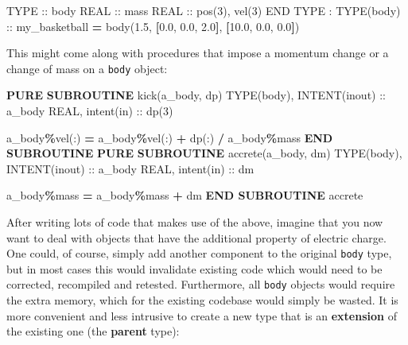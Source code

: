 \documentclass[
  paper=a4,
  ,captions=tableheading
]{scrartcl}
\newenvironment{Shaded}{\begin{snugshade}}{\end{snugshade}}
\newcommand{\DataTypeTok}[1]{\textcolor[rgb]{0.13,0.29,0.53}{#1}}
\newcommand{\DecValTok}[1]{\textcolor[rgb]{0.00,0.00,0.81}{#1}}
\newcommand{\FloatTok}[1]{\textcolor[rgb]{0.00,0.00,0.81}{#1}}
\newcommand{\KeywordTok}[1]{\textcolor[rgb]{0.13,0.29,0.53}{\textbf{#1}}}
\newcommand{\NormalTok}[1]{#1}
\newcommand{\OperatorTok}[1]{\textcolor[rgb]{0.81,0.36,0.00}{\textbf{#1}}}
\begin{document}
\begin{Shaded}
\begin{Highlighting}[]
\DataTypeTok{TYPE} \DataTypeTok{::}\NormalTok{ body}
   \DataTypeTok{REAL} \DataTypeTok{::}\NormalTok{ mass}
   \DataTypeTok{REAL} \DataTypeTok{::}\NormalTok{ pos(}\DecValTok{3}\NormalTok{), vel(}\DecValTok{3}\NormalTok{)}
\DataTypeTok{END TYPE}
\NormalTok{:}
\DataTypeTok{TYPE(body)} \DataTypeTok{::}\NormalTok{ my\_basketball }\KeywordTok{=}\NormalTok{ body(}\FloatTok{1.5}\NormalTok{, }\KeywordTok{[}\FloatTok{0.0}\NormalTok{, }\FloatTok{0.0}\NormalTok{, }\FloatTok{2.0}\KeywordTok{]}\NormalTok{, }\KeywordTok{[}\FloatTok{10.0}\NormalTok{, }\FloatTok{0.0}\NormalTok{, }\FloatTok{0.0}\KeywordTok{]}\NormalTok{)}
\end{Highlighting}
\end{Shaded}

This might come along with procedures that impose a momentum change or a
change of mass on a \texttt{body} object:

\begin{Shaded}
\begin{Highlighting}[]
\KeywordTok{PURE} \KeywordTok{SUBROUTINE}\NormalTok{ kick(a\_body, dp)}
   \DataTypeTok{TYPE(body)}\NormalTok{, }\DataTypeTok{INTENT(inout)} \DataTypeTok{::}\NormalTok{ a\_body}
   \DataTypeTok{REAL}\NormalTok{, }\DataTypeTok{intent(in)} \DataTypeTok{::}\NormalTok{ dp(}\DecValTok{3}\NormalTok{)}

\NormalTok{   a\_body}\OperatorTok{\%}\NormalTok{vel(:) }\KeywordTok{=}\NormalTok{ a\_body}\OperatorTok{\%}\NormalTok{vel(:) }\KeywordTok{+}\NormalTok{ dp(:) }\KeywordTok{/}\NormalTok{ a\_body}\OperatorTok{\%}\NormalTok{mass}
\KeywordTok{END SUBROUTINE}
\KeywordTok{PURE} \KeywordTok{SUBROUTINE}\NormalTok{ accrete(a\_body, dm)}
   \DataTypeTok{TYPE(body)}\NormalTok{, }\DataTypeTok{INTENT(inout)} \DataTypeTok{::}\NormalTok{ a\_body}
   \DataTypeTok{REAL}\NormalTok{, }\DataTypeTok{intent(in)} \DataTypeTok{::}\NormalTok{ dm}

\NormalTok{   a\_body}\OperatorTok{\%}\NormalTok{mass }\KeywordTok{=}\NormalTok{ a\_body}\OperatorTok{\%}\NormalTok{mass }\KeywordTok{+}\NormalTok{ dm}
\KeywordTok{END SUBROUTINE}\NormalTok{ accrete}
\end{Highlighting}
\end{Shaded}

After writing lots of code that makes use of the above, imagine that you
now want to deal with objects that have the additional property of
electric charge. One could, of course, simply add another component to
the original \texttt{body} type, but in most cases this would invalidate
existing code which would need to be corrected, recompiled and retested.
Furthermore, all \texttt{body} objects would require the extra memory,
which for the existing codebase would simply be wasted. It is more
convenient and less intrusive to create a new type that is an
\textbf{extension} of the existing one (the \textbf{parent} type):
\end{document}
